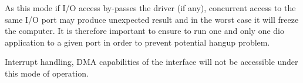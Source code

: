 \begin{DoxyItemize}
\item As this mode if I/O access by-\/passes the driver (if any), concurrent access to the same I/O port may produce unexpected result and in the worst case it will freeze the computer. It is therefore important to ensure to run one and only one dio application to a given port in order to prevent potential hangup problem.
\end{DoxyItemize}


\begin{DoxyItemize}
\item Interrupt handling, DMA capabilities of the interface will not be accessible under this mode of operation.
\end{DoxyItemize}

\label{index_end}
\hypertarget{index_end}{}
 \par


 \par
 